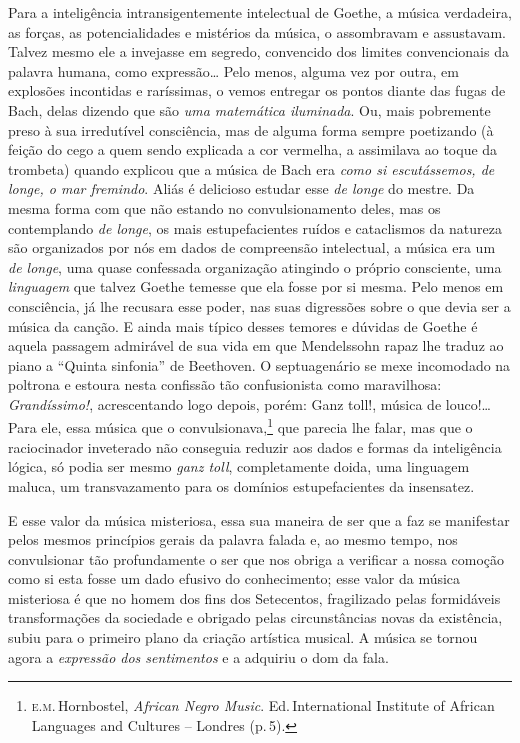 Para a inteligência intransigentemente intelectual de Goethe, a música
verdadeira, as forças, as potencialidades e mistérios da música, o
assombravam e assustavam. Talvez mesmo ele a invejasse em segredo,
convencido dos limites convencionais da palavra humana, como
expressão\ldots{} Pelo menos, alguma vez por outra, em explosões incontidas e
raríssimas, o vemos entregar os pontos diante das fugas de Bach, delas
dizendo que são \textit{uma matemática iluminada}. Ou, mais pobremente preso
à sua irredutível consciência, mas de alguma forma sempre poetizando (à
feição do cego a quem sendo explicada a cor vermelha, a assimilava ao
toque da trombeta) quando explicou que a música de Bach era \textit{como si
escutássemos, de longe, o mar fremindo}. Aliás é delicioso estudar esse
\textit{de longe} do mestre. Da mesma forma com que não estando no
convulsionamento deles, mas os contemplando \textit{de longe}, os mais
estupefacientes ruídos e cataclismos da natureza são organizados por nós
em dados de compreensão intelectual, a música era um \textit{de longe}, uma
quase confessada organização atingindo o próprio consciente, uma
\textit{linguagem} que talvez Goethe temesse que ela fosse por si mesma. Pelo
menos em consciência, já lhe recusara esse poder, nas suas digressões
sobre o que devia ser a música da canção. E ainda mais típico desses
temores e dúvidas de Goethe é aquela passagem admirável de sua vida em
que Mendelssohn rapaz lhe traduz ao piano a ``Quinta sinfonia'' de
Beethoven. O septuagenário se mexe incomodado na poltrona e estoura
nesta confissão tão confusionista como maravilhosa: \textit{Grandíssimo!},
acrescentando logo depois, porém: Ganz toll!, música de louco!\ldots{} Para
ele, essa música que o convulsionava,\footnote{\textsc{e.m.}\,Hornbostel, \emph{African Negro Music}. Ed.\,International Institute of
African Languages and Cultures -- Londres (p.\,5).} que parecia lhe falar, mas que
o raciocinador inveterado não conseguia reduzir aos dados e formas da
inteligência lógica, só podia ser mesmo \textit{ganz toll}, completamente doida,
uma linguagem maluca, um transvazamento para os domínios estupefacientes
da insensatez.

E esse valor da música misteriosa, essa sua maneira de ser que a faz se
manifestar pelos mesmos princípios gerais da palavra falada e, ao mesmo
tempo, nos convulsionar tão profundamente o ser que nos obriga a
verificar a nossa comoção como si esta fosse um dado efusivo do
conhecimento; esse valor da música misteriosa é que no homem dos fins
dos Setecentos, fragilizado pelas formidáveis transformações da
sociedade e obrigado pelas circunstâncias novas da existência, subiu
para o primeiro plano da criação artística musical. A música se tornou
agora a \textit{expressão dos sentimentos} e a adquiriu o dom da fala.

